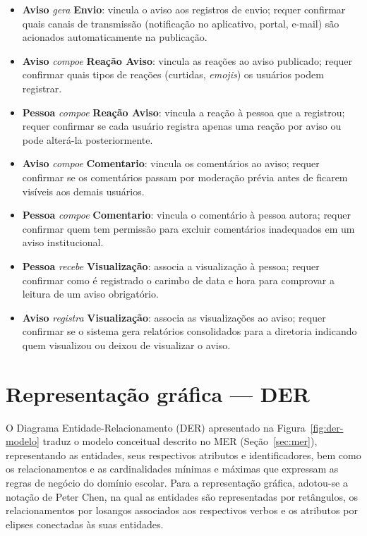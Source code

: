 \documentclass[a4paper,12pt]{report}
\begin{document}
\begin{itemize}
    \item \textbf{Aviso} \textit{gera} \textbf{Envio}: vincula o aviso aos registros de envio; requer confirmar quais canais de transmissão (notificação no aplicativo, portal, e-mail) são acionados automaticamente na publicação.
    \item \textbf{Aviso} \textit{compoe} \textbf{Reação Aviso}: vincula as reações ao aviso publicado; requer confirmar quais tipos de reações (curtidas, \textit{emojis}) os usuários podem registrar.
    \item \textbf{Pessoa} \textit{compoe} \textbf{Reação Aviso}: vincula a reação à pessoa que a registrou; requer confirmar se cada usuário registra apenas uma reação por aviso ou pode alterá-la posteriormente.
    \item \textbf{Aviso} \textit{compoe} \textbf{Comentario}: vincula os comentários ao aviso; requer confirmar se os comentários passam por moderação prévia antes de ficarem visíveis aos demais usuários.
    \item \textbf{Pessoa} \textit{compoe} \textbf{Comentario}: vincula o comentário à pessoa autora; requer confirmar quem tem permissão para excluir comentários inadequados em um aviso institucional.
    \item \textbf{Pessoa} \textit{recebe} \textbf{Visualização}: associa a visualização à pessoa; requer confirmar como é registrado o carimbo de data e hora para comprovar a leitura de um aviso obrigatório.
    \item \textbf{Aviso} \textit{registra} \textbf{Visualização}: associa as visualizações ao aviso; requer confirmar se o sistema gera relatórios consolidados para a diretoria indicando quem visualizou ou deixou de visualizar o aviso.
\end{itemize}

\section{Representação gráfica — DER}

O Diagrama Entidade-Relacionamento (DER) apresentado na Figura~\ref{fig:der-modelo} traduz o modelo conceitual descrito no MER (Seção~\ref{sec:mer}), representando as entidades, seus respectivos atributos e identificadores, bem como os relacionamentos e as cardinalidades mínimas e máximas que expressam as regras de negócio do domínio escolar. Para a representação gráfica, adotou-se a notação de Peter Chen, na qual as entidades são representadas por retângulos, os relacionamentos por losangos associados aos respectivos verbos e os atributos por elipses conectadas às suas entidades.
\end{document}
